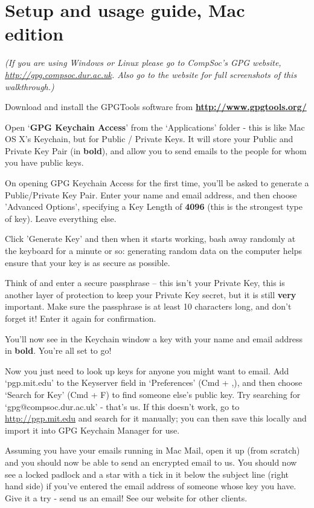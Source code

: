 \section{Setup and usage guide, Mac edition}
\textit{(If you are using Windows or Linux please go to CompSoc's GPG website, \href{http://gpg.compsoc.dur.ac.uk}{http://gpg.compsoc.dur.ac.uk}. Also go to the website for full screenshots of this walkthrough.)} 
\begin{compactenum}[1.]%
  \item Download and install the GPGTools software from \textbf{\href{http://www.gpgtools.org/}{http://www.gpgtools.org/}}
  \item Open `\textbf{GPG Keychain Access}' from the `Applications' folder - this is like Mac OS X's Keychain, but for Public / Private Keys. It will store your Public and Private Key Pair (in \textbf{bold}), and allow you to send emails to the people for whom you have public keys.
  \item On opening GPG Keychain Access for the first time, you'll be asked to generate a Public/Private Key Pair. Enter your name and email address, and then choose 'Advanced Options', specifying a Key Length of \textbf{4096} (this is the strongest type of key). Leave everything else.
  \item Click 'Generate Key' and then when it starts working, bash away randomly at the keyboard for a minute or so: generating random data on the computer helps ensure that your key is as secure as possible.
  \item Think of and enter a secure passphrase -- this isn't your Private Key, this is another layer of protection to keep your Private Key secret, but it is still \textbf{very} important. Make sure the passphrase is at least 10 characters long, and don't forget it! Enter it again for confirmation.
  \item You'll now see in the Keychain window a key with your name and email address in \textbf{bold}. You're all set to go! 
  \item Now you just need to look up keys for anyone you might want to email. Add `pgp.mit.edu' to the Keyserver field in `Preferences' (Cmd + ,), and then choose `Search for Key' (Cmd + F) to find someone else's public key. Try searching for `gpg@compsoc.dur.ac.uk' - that's us. If this doesn't work, go to \href{http://pgp.mit.edu}{http://pgp.mit.edu} and search for it manually; you can then save this locally and import it into GPG Keychain Manager for use.
  \item Assuming you have your emails running in Mac Mail, open it up (from scratch) and you should now be able to send an encrypted email to us. You should now see a locked padlock and a star with a tick in it below the subject line (right hand side) if you've entered the email address of someone whose key you have. Give it a try - send us an email! See our website for other clients.

\end{compactenum}
